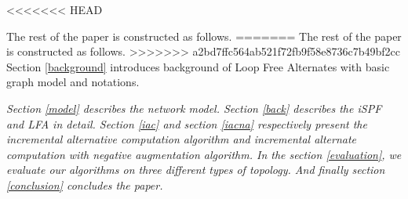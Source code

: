 <<<<<<< HEAD


The rest of the paper is constructed as follows. 
=======
The rest of the paper is constructed as follows.
>>>>>>> a2bd7ffc564ab521f72fb9f58e8736c7b49bf2cc
Section \ref{background} introduces background of Loop Free Alternates with basic graph model and notations.

{\em Section \ref{model}  describes the network model.
Section \ref{back} describes the iSPF and LFA in detail.
Section \ref{iac} and section \ref{iacna} respectively present the incremental alternative computation algorithm and incremental alternate computation with negative augmentation algorithm.
In the section \ref{evaluation}, we evaluate our algorithms on three different types of topology.  And finally section \ref{conclusion} concludes the paper.
}



